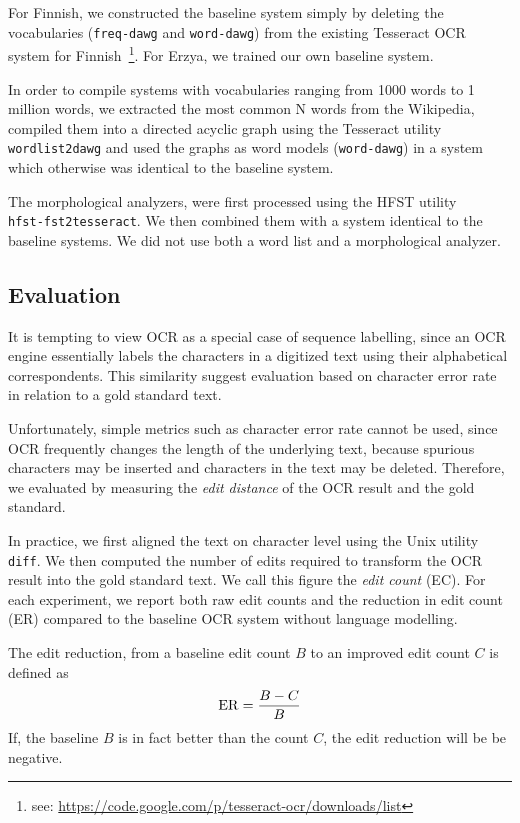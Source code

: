\documentclass[b5paper]{article}
\begin{document}
For Finnish, we constructed the baseline system simply by deleting the
vocabularies ({\tt freq-dawg} and {\tt word-dawg}) from the existing
Tesseract OCR system for Finnish~\footnote{see:
  \url{https://code.google.com/p/tesseract-ocr/downloads/list}}. For
Erzya, we trained our own baseline system.

In order to compile systems with vocabularies ranging from 1000 words
to 1 million words, we extracted the most common N words from the
Wikipedia, compiled them into a directed acyclic graph using the
Tesseract utility {\tt wordlist2dawg} and used the graphs as word
models ({\tt word-dawg}) in a system which otherwise was identical to
the baseline system.

The morphological analyzers, were first processed using the HFST
utility\\{\tt hfst-fst2tesseract}. We then combined them with a system
identical to the baseline systems. We did not use both a word list and
a morphological analyzer.

\subsection{Evaluation}
It is tempting to view OCR as a special case of sequence labelling,
since an OCR engine essentially labels the characters in a digitized
text using their alphabetical correspondents. This similarity suggest
evaluation based on character error rate in relation to a gold
standard text.

Unfortunately, simple metrics such as character error rate cannot be
used, since OCR frequently changes the length of the underlying text,
because spurious characters may be inserted and characters in the text
may be deleted. Therefore, we evaluated by measuring the {\it edit
  distance} \cite{levenshtein66} of the OCR result and the gold
standard.

In practice, we first aligned the text on character level using the
Unix utility {\tt diff}. We then computed the number of edits required
to transform the OCR result into the gold standard text. We call this
figure the {\it edit count} (EC). For each experiment, we report both
raw edit counts and the reduction in edit count (ER) compared to the
baseline OCR system without language modelling.

The edit reduction, from a baseline edit count $B$ to an improved edit
count $C$ is defined as
$${\rm ER} = \frac{B - C}{B}$$
If, the baseline $B$ is in fact better than the count $C$, the edit
reduction will be be negative.
\end{document}
